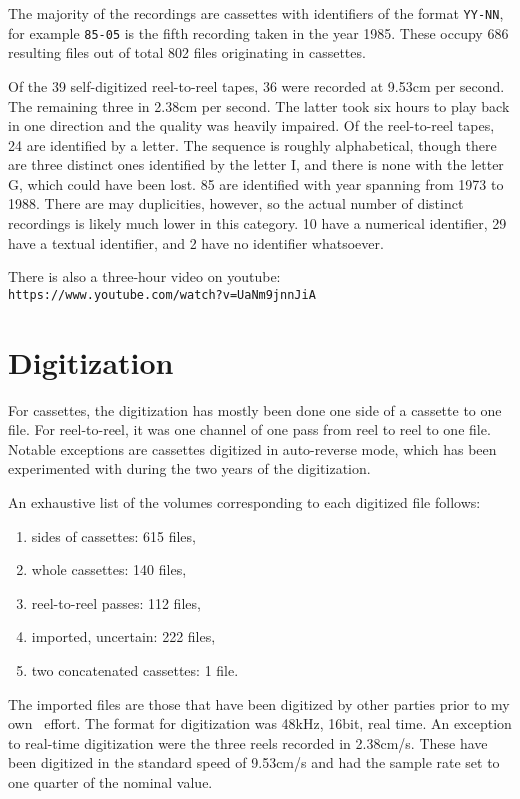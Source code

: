 \documentclass[runningheads]{llncs}
\begin{document}
The majority of the recordings are cassettes with
identifiers of the format \texttt{YY-NN}, for example \texttt{85-05} is the fifth recording taken in the year 1985. These occupy 686 resulting files out of total 802 files originating in cassettes.

Of the 39 self-digitized reel-to-reel tapes, 36 were recorded at 9.53cm per
second. The remaining three in 2.38cm per second. The latter took six hours to
play back in one direction and the quality was heavily impaired. Of the
reel-to-reel tapes, 24 are identified by a letter. The sequence
is roughly alphabetical, though there
are three distinct ones identified by the letter I, and there is none with the
letter G, which could have been lost. 85 are identified with year spanning from
1973 to 1988. There are may duplicities, however, so the actual number of
distinct recordings is likely much lower in this category. 10 have a numerical
identifier, 29 have a textual identifier, and 2 have no identifier whatsoever.

There is also a three-hour video on youtube: \\
\texttt{https://www.youtube.com/watch?v=UaNm9jnnJiA}

\section{Digitization}

For cassettes, the digitization has mostly been done one side of a cassette to
one file. For reel-to-reel, it was one channel of one pass from reel to reel to one file. Notable exceptions are cassettes digitized in auto-reverse mode, which has been experimented with during the two years of the digitization. 

An exhaustive list of the volumes corresponding to each digitized file follows:
\begin{enumerate}
    \item{sides of cassettes: 615 files,}
    \item{whole cassettes: 140 files,}
    \item{reel-to-reel passes: 112 files,}
    \item{imported, uncertain: 222 files,}
    \item{two concatenated cassettes: 1 file.}
\end{enumerate}

The imported files are those that have been digitized by other parties prior to my own  effort. The format for digitization was 48kHz, 16bit, real time. An exception to real-time digitization were the three reels recorded in 2.38cm/s. These have been digitized in the standard speed of 9.53cm/s and had the sample rate set to one quarter of the nominal value.
\end{document}
